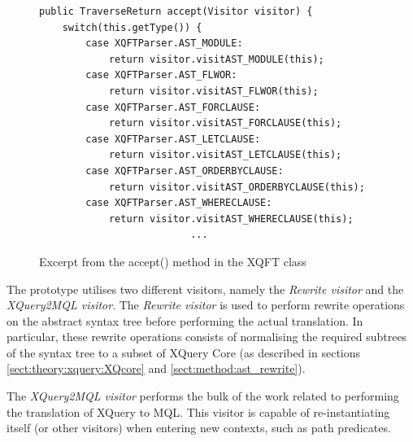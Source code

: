 \begin{figure}[htp]
\begin{center}
  \begin{Verbatim}	
public TraverseReturn accept(Visitor visitor) {
    switch(this.getType()) {
        case XQFTParser.AST_MODULE:
            return visitor.visitAST_MODULE(this);
        case XQFTParser.AST_FLWOR:
            return visitor.visitAST_FLWOR(this);
        case XQFTParser.AST_FORCLAUSE:
            return visitor.visitAST_FORCLAUSE(this);
        case XQFTParser.AST_LETCLAUSE:
            return visitor.visitAST_LETCLAUSE(this);
        case XQFTParser.AST_ORDERBYCLAUSE:
            return visitor.visitAST_ORDERBYCLAUSE(this);
        case XQFTParser.AST_WHERECLAUSE:
            return visitor.visitAST_WHERECLAUSE(this);
                          ...
  \end{Verbatim}
  \caption{Excerpt from the accept() method in the XQFT class}
  \label{fig:impl:accept}
\end{center}
\end{figure}

The prototype utilises two different visitors, namely the \textit{Rewrite visitor} and the \textit{XQuery2MQL
visitor}. The \textit{Rewrite visitor} is used to perform rewrite operations on the
abstract syntax tree before performing the actual translation. In particular,
these rewrite operations consists of normalising the required subtrees of the
syntax tree to a subset of XQuery Core (as described in sections
\ref{sect:theory:xquery:XQcore} and \ref{sect:method:ast_rewrite}).

The \textit{XQuery2MQL visitor} performs the bulk of the work related to
performing the translation of XQuery to MQL. This visitor is capable of
re-instantiating itself (or other visitors) when entering new contexts, such as
path predicates. 